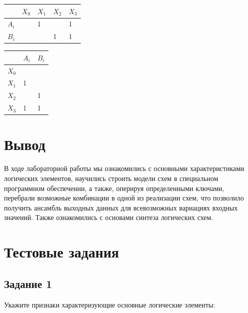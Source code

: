 \documentclass[bachelor, och, labwork]{shiza}
\begin{document}
\begin{table}[H]
    \begin{center}
    \begin{tabular}{|l|l|l|l|l|}
    \hline
          & $X_0$ & $X_1$ & $X_2$ & $X_3$ \\ \hline
    $A_i$ &       & 1     &       & 1     \\ \hline
    $B_i$ &       &       & 1     & 1     \\ \hline
    \end{tabular}
    \end{center}
\end{table}

\begin{table}[H]
    \begin{center}
    \begin{tabular}{|l|l|l|}
    \hline
          & $A_i$ & $B_i$ \\ \hline
    $X_0$ &       &       \\ \hline
    $X_1$ & 1     &       \\ \hline
    $X_2$ &       & 1     \\ \hline
    $X_3$ & 1     & 1     \\ \hline
    \end{tabular}
    \end{center}
\end{table}

\section{Вывод}
В ходе лабораторной работы мы ознакомились с основными характеристиками логических
элементов, научились строить модели схем в специальном программном обеспечении,
а также, оперируя определенными ключами, перебрали возможные комбинации в
одной из реализации схем, что позволило получить ансамбль выходных данных
для всевозможных вариациях входных значений. Также ознакомились с основами
синтеза логических схем.

\section{Тестовые задания}

\subsection{Задание 1}
    Укажите признаки характеризующие основные логические элементы:
    
\end{document}
